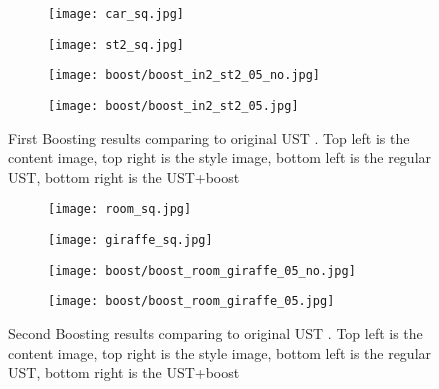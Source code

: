 \begin{figure}[H]
	\centering
	\begin{subfigure}[b]{0.4\linewidth}
		\texttt{[image: car\_sq.jpg]} %
	\end{subfigure}
	\begin{subfigure}[b]{0.4\linewidth}
		\texttt{[image: st2\_sq.jpg]} %
	\end{subfigure}
	\begin{subfigure}[b]{0.4\linewidth}
		\texttt{[image: boost/boost\_in2\_st2\_05\_no.jpg]} %
	\end{subfigure}
	\begin{subfigure}[b]{0.4\linewidth}
		\texttt{[image: boost/boost\_in2\_st2\_05.jpg]} %
	\end{subfigure}
	\caption{First Boosting results comparing to original UST \cite{bib11}. Top left is the content image, top right is the style image, bottom left is the regular UST, bottom right is the UST+boost}
	\label{fig:Boost1}
\end{figure}
\begin{figure}[H]
	\centering
	\begin{subfigure}[b]{0.4\linewidth}
		\texttt{[image: room\_sq.jpg]} %
	\end{subfigure}
	\begin{subfigure}[b]{0.4\linewidth}
		\texttt{[image: giraffe\_sq.jpg]} %
	\end{subfigure}
	\begin{subfigure}[b]{0.4\linewidth}
		\texttt{[image: boost/boost\_room\_giraffe\_05\_no.jpg]} %
	\end{subfigure}
	\begin{subfigure}[b]{0.4\linewidth}
		\texttt{[image: boost/boost\_room\_giraffe\_05.jpg]} %
	\end{subfigure}
	\caption{Second Boosting results comparing to original UST \cite{bib11}. Top left is the content image, top right is the style image, bottom left is the regular UST, bottom right is the UST+boost}
	\label{fig:Boost2}
\end{figure}

